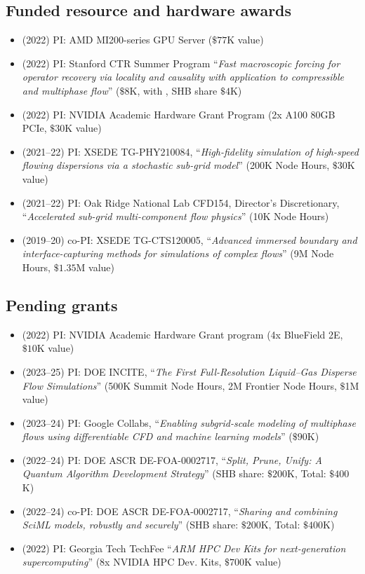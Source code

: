 \subsection{Funded resource and hardware awards}

\begin{itemize}
    \item (2022) PI: AMD MI200-series GPU Server ($\$77$K value)
    \item (2022) PI: Stanford CTR Summer Program ``\textit{Fast macroscopic forcing for operator recovery via locality and causality with application to compressible and multiphase flow}'' ($\$8$K, with \Florian, SHB share $\$4$K)
    \item (2022) PI: NVIDIA Academic Hardware Grant Program (2x A100 80GB PCIe, $\$30$K value)
    \item (2021--22) PI: XSEDE TG-PHY210084, ``\textit{High-fidelity simulation of high-speed flowing dispersions via a stochastic sub-grid model}''  (200K Node Hours, $\$30$K value)
    \item (2021--22) PI: Oak Ridge National Lab CFD154, Director's Discretionary, ``\textit{Accelerated sub-grid multi-component flow physics}'' (10K Node Hours)
    \item (2019--20) co-PI: XSEDE TG-CTS120005, ``\textit{Advanced immersed boundary and interface-capturing methods for simulations of complex flows}'' (9M Node Hours, $\$1.35$M value)
\end{itemize}

\subsection{Pending grants}

\begin{itemize}
    \item (2022) PI: NVIDIA Academic Hardware Grant program (4x BlueField 2E, $\$10$K value) 
    \item (2023--25) PI: DOE INCITE, ``\textit{The First Full-Resolution Liquid--Gas Disperse Flow Simulations}'' (500K Summit Node Hours, 2M Frontier Node Hours, $\$$1M value)
    \item (2023--24) PI: Google Collabs, ``\textit{Enabling subgrid-scale modeling of multiphase flows using differentiable CFD and machine learning models}'' ($\$90$K)
    \item (2022--24) PI: DOE ASCR DE-FOA-0002717, ``\textit{Split, Prune, Unify: A Quantum Algorithm Development Strategy}'' (SHB share: $\$200$K, Total: $\$400$K)
    \item (2022--24) co-PI: DOE ASCR DE-FOA-0002717, ``\textit{Sharing and combining SciML models, robustly and securely}'' (SHB share: $\$200$K, Total: $\$400$K)
    \item (2022) PI: Georgia Tech TechFee ``\textit{ARM HPC Dev Kits for next-generation supercomputing}'' (8x NVIDIA HPC Dev. Kits, $\$700$K value)
\end{itemize}

